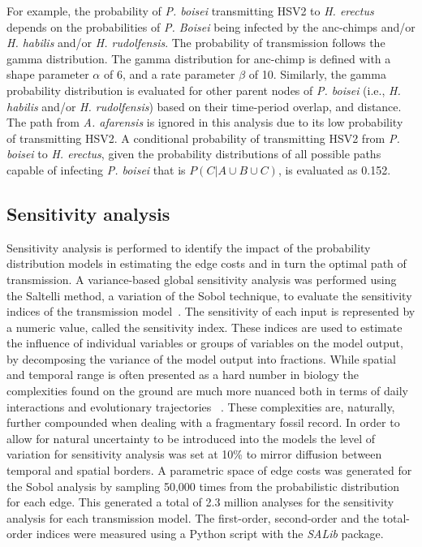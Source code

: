\documentclass[fleqn,10pt]{wlscirep}
\begin{document}
For example, the probability of \textit{P. boisei} transmitting HSV2 to \textit{H. erectus} depends on the probabilities of \textit{P. Boisei} being infected by the anc-chimps and/or \textit{H. habilis} and/or \textit{H. rudolfensis}. The probability of transmission follows the gamma distribution. The gamma distribution for anc-chimp is defined with a shape parameter $\alpha$ of 6, and a rate parameter $\beta$ of 10. Similarly, the gamma probability distribution is evaluated for other parent nodes of \textit{P. boisei} (i.e., \textit{H. habilis} and/or \textit{H. rudolfensis}) based on their time-period overlap, and distance. The path from \textit{A. afarensis} is ignored in this analysis due to its low probability of transmitting HSV2. A conditional probability of transmitting HSV2 from \textit{P. boisei} to \textit{H. erectus}, given the probability distributions of all possible paths capable of infecting \textit{P. boisei} that is $P(C | A \cup B \cup C)$, is evaluated as 0.152.

\subsection*{Sensitivity analysis}
Sensitivity analysis is performed to identify the impact of the probability distribution models in estimating the edge costs and in turn the optimal path of transmission. A variance-based global sensitivity analysis was performed using the Saltelli method, a variation of the Sobol technique, to evaluate the sensitivity indices of the transmission model~\citep{Sobol2001,Saltelli2010}. The sensitivity of each input is represented by a numeric value, called the sensitivity index. These indices are used to estimate the influence of individual variables or groups of variables on the model output, by decomposing the variance of the model output into fractions. While spatial and temporal range is often presented as a hard number in biology the complexities found on the ground are much more nuanced both in terms of daily interactions and evolutionary trajectories ~\citep{Benton1996}. These complexities are, naturally, further compounded when dealing with a fragmentary fossil record.  In order to allow for natural uncertainty to be introduced into the models the level of variation for sensitivity analysis was set at 10\% to mirror diffusion between temporal and spatial borders. A parametric space of edge costs was generated for the Sobol analysis by sampling 50,000 times from the probabilistic distribution for each edge. This generated a total of 2.3 million analyses for the sensitivity analysis for each transmission model. The first-order, second-order and the total-order indices were measured using a Python script with the \textit{SALib} package.
\end{document}

